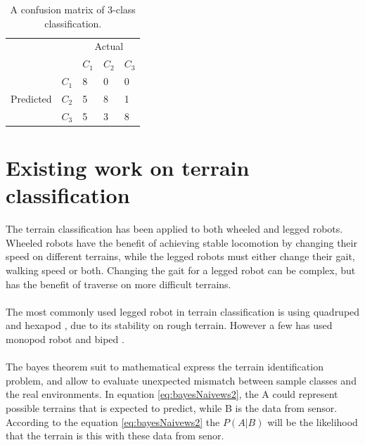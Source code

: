 \documentclass[USenglish]{ifimaster}  %
\begin{document}
	\begin{table}[h]
		\centering
		\begin{tabular}{ll|l|l|l|}
			\cline{3-5}
			&  & \multicolumn{3}{c|}{Actual} \\ \cline{3-5} 
			&  & $C_1$ & $C_2$ & $C_3$ \\ \hline
			\multicolumn{1}{|l|}{\multirow{3}{*}{Predicted}} & $C_1$ & 8 & 0 & 0 \\ \cline{2-5} 
			\multicolumn{1}{|l|}{} & $C_2$ & 5 & 8 & 1 \\ \cline{2-5} 
			\multicolumn{1}{|l|}{} & $C_3$ & 5 & 3 & 8 \\ \hline
		\end{tabular}
		\caption{A confusion matrix of 3-class classification.}
		\label{tab:cmatrix}
	\end{table}
	
	
\section{Existing work on terrain classification}
The terrain classification has been applied to both wheeled and legged robots. Wheeled robots have the benefit of achieving stable locomotion by changing their speed on different terrains, while the legged robots must either change their gait, walking speed or both. Changing the gait for a legged robot can be complex, but has the benefit of traverse on more difficult terrains. 
\\
\\
The most commonly used legged robot in terrain classification is using quadruped \cite{6784609,littleDog,6849778,Hoffmann20141790} and hexapod \cite{Walas2015,26b23e912c654fe4b7478fd910130195,6569179}, due to its stability on rough terrain. However a few has used monopod robot \cite{5602459} and biped \cite{7803265}.
\\
\\
The bayes theorem suit to mathematical express the terrain identification problem, and allow to evaluate unexpected mismatch between sample classes and the real environments. In equation \ref{eq:bayesNaivews2}, the A could represent possible terrains that is expected to predict, while B is the data from sensor. According to the equation \ref{eq:bayesNaivews2} the $P(A \vert B)$ will be the likelihood that the terrain is this with these data from senor.

		
\end{document}
